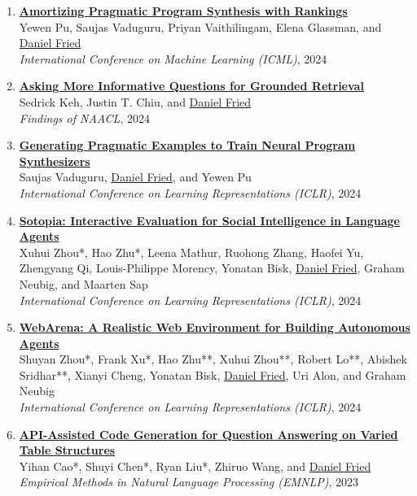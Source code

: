 \begin{enumerate}[leftmargin=-1mm,partopsep=0pt]
\item \href{https://arxiv.org/abs/2407.02499}{\textbf{Amortizing Pragmatic Program Synthesis with Rankings}} \\
  Yewen Pu, Saujas Vaduguru, Priyan Vaithilingam, Elena Glassman, and \underline{Daniel Fried}\\
  \emph{International Conference on Machine Learning (ICML)}, 2024

\item \href{https://arxiv.org/abs/2311.08584}{\textbf{Asking More Informative Questions for Grounded Retrieval}} \\
  Sedrick Keh, Justin T. Chiu, and \underline{Daniel Fried}\\
  \emph{Findings of NAACL}, 2024

\item \href{https://arxiv.org/abs/2311.05740}{\textbf{Generating Pragmatic Examples to Train Neural Program Synthesizers}} \\
  Saujas Vaduguru, \underline{Daniel Fried}, and Yewen Pu\\
  \emph{International Conference on Learning Representations (ICLR)}, 2024

\item \href{http://arxiv.org/abs/2310.11667}{\textbf{Sotopia: Interactive Evaluation for Social Intelligence in Language Agents}} \\
  Xuhui Zhou*, Hao Zhu*, Leena Mathur, Ruohong Zhang, Haofei Yu, Zhengyang Qi, Louis-Philippe Morency, Yonatan Bisk, \underline{Daniel Fried}, Graham Neubig, and Maarten Sap\\
  \emph{International Conference on Learning Representations (ICLR)}, 2024

\item \href{https://arxiv.org/abs/2307.13854}{\textbf{WebArena: A Realistic Web Environment for Building Autonomous Agents}} \\
  Shuyan Zhou*, Frank Xu*, Hao Zhu**, Xuhui Zhou**, Robert Lo**, Abishek Sridhar**, Xianyi Cheng, Yonatan Bisk, \underline{Daniel Fried}, Uri Alon, and Graham Neubig\\
  \emph{International Conference on Learning Representations (ICLR)}, 2024

\item \href{https://arxiv.org/abs/2310.14687}{\textbf{API-Assisted Code Generation for Question Answering on Varied Table Structures}} \\
  Yihan Cao*, Shuyi Chen*, Ryan Liu*, Zhiruo Wang, and \underline{Daniel Fried}\\
  \emph{Empirical Methods in Natural Language Processing (EMNLP)}, 2023


\end{enumerate}
